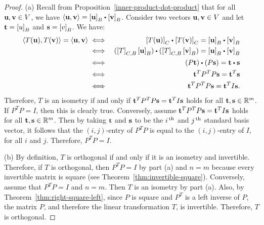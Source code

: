 \begin{proof}
  (a) Recall from Proposition~\ref{inner-product-dot-product} that for
  all $\vect{u},\vect{v}\in V$, we have
  $\iprod{\vect{u},\vect{v}} = \coord{\vect{u}}_B\dotprod
  \coord{\vect{v}}_B$. Consider two vectors $\vect{u},\vect{v}\in V$
  and let $\vect{t}=\coord{u}_B$ and $\vect{s}=\coord{v}_B$. We have:
  \begin{eqnarray*}
    \iprod{T(\vect{u}),T(\vect{v})} = \iprod{\vect{u},\vect{v}}
    &\iff& \coord{T(\vect{u})}_C\dotprod \coord{T(\vect{v})}_C
           = \coord{\vect{u}}_B\dotprod \coord{\vect{v}}_B \\
    &\iff& (\coord{T}_{C,B}\coord{\vect{u}}_B)\dotprod (\coord{T}_{C,B}\coord{\vect{v}}_B)
           = \coord{\vect{u}}_B\dotprod \coord{\vect{v}}_B \\
    &\iff& (P\vect{t})\dotprod (P\vect{s})
           = \vect{t}\dotprod \vect{s} \\
    &\iff& \vect{t}^T P^T P\vect{s}
           = \vect{t}^T \vect{s} \\
    &\iff& \vect{t}^T P^T P\vect{s}
           = \vect{t}^T I \vect{s}.
  \end{eqnarray*}
  Therefore, $T$ is an isometry if and only if
  $\vect{t}^T P^T P\vect{s} = \vect{t}^T I \vect{s}$ holds for all
  $\vect{t},\vect{s}\in\R^m$. If $P^TP=I$, then this is clearly
  true. Conversely, assume
  $\vect{t}^T P^T P\vect{s} = \vect{t}^T I \vect{s}$ holds for all
  $\vect{t},\vect{s}\in\R^m$. Then by taking $\vect{t}$ and $\vect{s}$
  to be the $i^{\,\rm th}$ and $j^{\,\rm th}$ standard basis vector, it follows that
  the $(i,j)$-entry of $P^TP$ is equal to the $(i,j)$-entry of $I$,
  for all $i$ and $j$. Therefore, $P^TP=I$.

  (b) By definition, $T$ is orthogonal if and only if it is an
  isometry and invertible. Therefore, if $T$ is orthogonal, then
  $P^TP=I$ by part (a) and $n=m$ because every invertible matrix is
  square (see Theorem~\ref{thm:invertible-square}). Conversely, assume
  that $P^TP=I$ and $n=m$. Then $T$ is an isometry by part (a). Also,
  by Theorem~\ref{thm:right-square-left}, since $P$ is square and
  $P^T$ is a left inverse of $P$, the matrix $P$, and therefore the
  linear transformation $T$, is invertible. Therefore, $T$ is
  orthogonal.
\end{proof}

